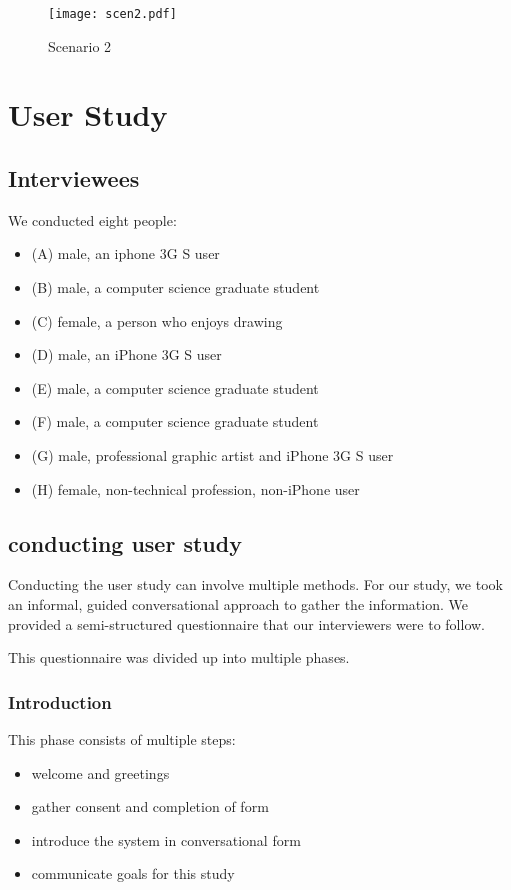 \documentclass{chi2009}
\begin{document}
\begin{figure}
\centering
\texttt{[image: scen2.pdf]}
\caption{Scenario 2} \label{fig:s2}
\end{figure}

\section{User Study}

\subsection{Interviewees}

We conducted eight people:

\begin{itemize}
\item (A) male, an iphone 3G S user
\item (B) male, a computer science graduate student
\item (C) female, a person who enjoys drawing
\item (D) male, an iPhone 3G S user
\item (E) male, a computer science graduate student
\item (F) male, a computer science graduate student
\item (G) male, professional graphic artist and iPhone 3G S user
\item (H) female, non-technical profession, non-iPhone user
\end{itemize}

\subsection{conducting user study}

Conducting the user study can involve multiple methods.  For our study, we took
an informal, guided conversational approach to gather the information.  We
provided a semi-structured questionnaire that our interviewers were to follow.

This questionnaire was divided up into multiple phases.

\subsubsection{Introduction}

This phase consists of multiple steps:
\begin{itemize}
\item welcome and greetings
\item gather consent and completion of form
\item introduce the system in conversational form
\item communicate goals for this study
\end{itemize}
\end{document}
